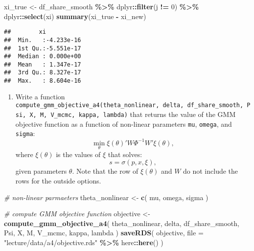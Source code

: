 \documentclass[
]{book}
\newenvironment{Shaded}{\begin{snugshade}}{\end{snugshade}}
\newcommand{\AttributeTok}[1]{\textcolor[rgb]{0.13,0.29,0.53}{#1}}
\newcommand{\CommentTok}[1]{\textcolor[rgb]{0.56,0.35,0.01}{\textit{#1}}}
\newcommand{\DecValTok}[1]{\textcolor[rgb]{0.00,0.00,0.81}{#1}}
\newcommand{\FunctionTok}[1]{\textcolor[rgb]{0.13,0.29,0.53}{\textbf{#1}}}
\newcommand{\NormalTok}[1]{#1}
\newcommand{\OtherTok}[1]{\textcolor[rgb]{0.56,0.35,0.01}{#1}}
\newcommand{\SpecialCharTok}[1]{\textcolor[rgb]{0.81,0.36,0.00}{\textbf{#1}}}
\newcommand{\StringTok}[1]{\textcolor[rgb]{0.31,0.60,0.02}{#1}}
\providecommand{\tightlist}{%
  \setlength{\itemsep}{0pt}\setlength{\parskip}{0pt}}
\begin{document}
\begin{Shaded}
\begin{Highlighting}[]
\NormalTok{xi\_true }\OtherTok{\textless{}{-}}
\NormalTok{  df\_share\_smooth }\SpecialCharTok{\%\textgreater{}\%}
\NormalTok{  dplyr}\SpecialCharTok{::}\FunctionTok{filter}\NormalTok{(j }\SpecialCharTok{!=} \DecValTok{0}\NormalTok{) }\SpecialCharTok{\%\textgreater{}\%}
\NormalTok{  dplyr}\SpecialCharTok{::}\FunctionTok{select}\NormalTok{(xi)}
\FunctionTok{summary}\NormalTok{(xi\_true }\SpecialCharTok{{-}}\NormalTok{ xi\_new)}
\end{Highlighting}
\end{Shaded}

\begin{verbatim}
##        xi            
##  Min.   :-4.233e-16  
##  1st Qu.:-5.551e-17  
##  Median : 0.000e+00  
##  Mean   : 1.347e-17  
##  3rd Qu.: 8.327e-17  
##  Max.   : 8.604e-16
\end{verbatim}

\begin{enumerate}
\def\labelenumi{\arabic{enumi}.}
\setcounter{enumi}{10}
\tightlist
\item
  Write a function \texttt{compute\_gmm\_objective\_a4(theta\_nonlinear,\ delta,\ df\_share\_smooth,\ Psi,\ X,\ M,\ V\_mcmc,\ kappa,\ lambda)} that returns the value of the GMM objective function as a function of non-linear parameters \texttt{mu}, \texttt{omega}, and \texttt{sigma}:
  \[
  \min_{\theta} \xi(\theta)' W \Phi^{-1} W' \xi(\theta),
  \]
  where \(\xi(\theta)\) is the values of \(\xi\) that solves:
  \[
  s = \sigma(p, x, \xi),
  \]
  given parameters \(\theta\). Note that the row of \(\xi(\theta)\) and \(W\) do not include the rows for the outside options.
\end{enumerate}

\begin{Shaded}
\begin{Highlighting}[]
\CommentTok{\# non{-}linear parmaeters}
\NormalTok{theta\_nonlinear }\OtherTok{\textless{}{-}} 
  \FunctionTok{c}\NormalTok{(}
\NormalTok{    mu, }
\NormalTok{    omega, }
\NormalTok{    sigma}
\NormalTok{    )}
\end{Highlighting}
\end{Shaded}

\begin{Shaded}
\begin{Highlighting}[]
\CommentTok{\# compute GMM objective function}
\NormalTok{objective }\OtherTok{\textless{}{-}}
  \FunctionTok{compute\_gmm\_objective\_a4}\NormalTok{(}
\NormalTok{    theta\_nonlinear, }
\NormalTok{    delta, }
\NormalTok{    df\_share\_smooth, }
\NormalTok{    Psi, }
\NormalTok{    X, }
\NormalTok{    M, }
\NormalTok{    V\_mcmc, }
\NormalTok{    kappa, }
\NormalTok{    lambda}
\NormalTok{    ) }
\FunctionTok{saveRDS}\NormalTok{(}
\NormalTok{  objective, }
  \AttributeTok{file =} \StringTok{"lecture/data/a4/objective.rds"} \SpecialCharTok{\%\textgreater{}\%}\NormalTok{ here}\SpecialCharTok{::}\FunctionTok{here}\NormalTok{()}
\NormalTok{)}
\end{Highlighting}
\end{Shaded}
\end{document}
